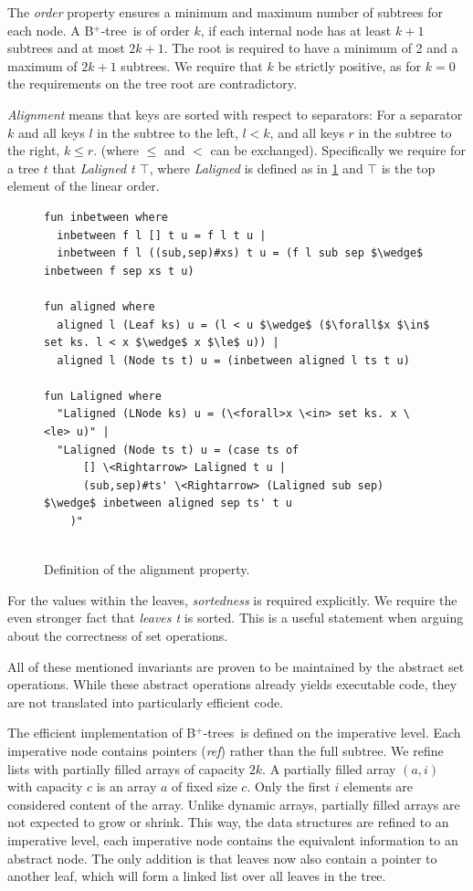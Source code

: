 \documentclass[a4paper,UKenglish,cleveref, cref, thm-restate]{lipics-v2021}
\newcommand{\btree}{B$^+$-tree}
\newcommand{\btrees}{B$^+$-trees}
\begin{document}
The \textit{order} property ensures a minimum and maximum
number of subtrees for each node.
A \btree\ is of order $k$, if each internal node has at least $k+1$
subtrees and at most $2k+1$.
The root is required to have a minimum of 2 and a maximum of $2k+1$ subtrees.
We require that $k$ be strictly positive, as for $k = 0$ the requirements on the tree
root are contradictory.

\textit{Alignment} means that keys are sorted with respect to separators:
For a separator $k$ and all keys $l$ in the subtree to the left, $l < k$,
and all keys $r$ in the subtree to the right, $k \leq r$.
(where $\leq$ and $<$ can be exchanged).
Specifically we require for a tree $t$ that \emph{Laligned t $\top$},
where \emph{Laligned} is defined as in \cref{fig:btree-alignment-def}
and $\top$ is the top element of the linear order. 

\begin{figure}
\begin{lstlisting}[mathescape=true, language=Isabelle,label=lst:btree-alignment-def]
fun inbetween where
  inbetween f l [] t u = f l t u |
  inbetween f l ((sub,sep)#xs) t u = (f l sub sep $\wedge$ inbetween f sep xs t u)

fun aligned where
  aligned l (Leaf ks) u = (l < u $\wedge$ ($\forall$x $\in$ set ks. l < x $\wedge$ x $\le$ u)) |
  aligned l (Node ts t) u = (inbetween aligned l ts t u)

fun Laligned where
  "Laligned (LNode ks) u = (\<forall>x \<in> set ks. x \<le> u)" |
  "Laligned (Node ts t) u = (case ts of
      [] \<Rightarrow> Laligned t u |
      (sub,sep)#ts' \<Rightarrow> (Laligned sub sep) $\wedge$ inbetween aligned sep ts' t u
    )"
  
\end{lstlisting}
\caption{Definition of the alignment property.}
\label{fig:btree-alignment-def}
\end{figure}


For the values within the leaves, \textit{sortedness} is required explicitly.
We require the even stronger fact that \emph{leaves t} is sorted.
This is a useful statement when arguing about the correctness of set operations.

All of these mentioned invariants are proven to be maintained by the abstract set operations.
While these abstract operations already yields executable code,
they are not translated into particularly efficient code.

The efficient implementation of \btrees\ is defined
on the imperative level.
Each imperative node contains pointers (\emph{ref}) rather than the full subtree.
We refine lists with partially filled arrays of capacity $2k$.
A partially filled array $(a,i)$ with capacity $c$ is an array $a$ of fixed size $c$.
Only the first $i$ elements are considered content of the array.
Unlike dynamic arrays, partially filled arrays are not expected to grow or shrink.
This way, the data structures are refined to an imperative level,
each imperative node contains the equivalent information to an abstract node.
The only addition is that leaves now also contain a pointer to another leaf,
which will form a linked list over all leaves in the tree.
\end{document}
